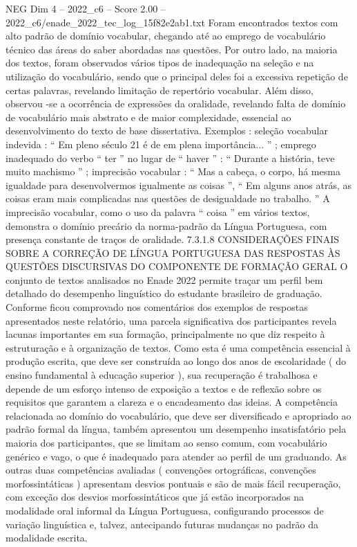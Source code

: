 \begin{textsample}{NEG Dim 4 – 2022\_c6 – Score 2.00 – 2022\_c6/enade\_2022\_tec\_log\_15f82e2ab1.txt}
Foram encontrados textos com alto padrão de domínio vocabular, chegando até ao emprego de vocabulário técnico das áreas do saber abordadas nas questões.
Por outro lado, na maioria dos textos, foram observados vários tipos de inadequação na seleção e na utilização do vocabulário, sendo que o principal deles foi a excessiva repetição de certas palavras, revelando limitação de repertório vocabular.
Além disso, observou -se a ocorrência de expressões da oralidade, revelando falta de domínio de vocabulário mais abstrato e de maior complexidade, essencial ao desenvolvimento do texto de base dissertativa.
Exemplos : seleção vocabular indevida : “ Em pleno século 21 é de em plena importância... ” ; emprego inadequado do verbo “ ter ” no lugar de “ haver ” : “ Durante a história, teve muito machismo ” ; imprecisão vocabular : “ Mas a cabeça, o corpo, há mesma igualdade para desenvolvermos igualmente as coisas ”, “ Em alguns anos atrás, as coisas eram mais complicadas nas questões de desigualdade no trabalho. ” A imprecisão vocabular, como o uso da palavra “ coisa ” em vários textos, demonstra o domínio precário da norma-padrão da Língua Portuguesa, com presença constante de traços de oralidade. 7.3.1.8 CONSIDERAÇÕES FINAIS SOBRE A CORREÇÃO DE LÍNGUA PORTUGUESA DAS RESPOSTAS ÀS QUESTÕES DISCURSIVAS DO COMPONENTE DE FORMAÇÃO GERAL O conjunto de textos analisados no Enade 2022 permite traçar um perfil bem detalhado do desempenho linguístico do estudante brasileiro de graduação.
Conforme ficou comprovado nos comentários dos exemplos de respostas apresentados neste relatório, uma parcela significativa dos participantes revela lacunas importantes em sua formação, principalmente no que diz respeito à estruturação e à organização de textos.
Como esta é uma competência essencial à produção escrita, que deve ser construída ao longo dos anos de escolaridade ( do ensino fundamental à educação superior ), sua recuperação é trabalhosa e depende de um esforço intenso de exposição a textos e de reflexão sobre os requisitos que garantem a clareza e o encadeamento das ideias.
A competência relacionada ao domínio do vocabulário, que deve ser diversificado e apropriado ao padrão formal da língua, também apresentou um desempenho insatisfatório pela maioria dos participantes, que se limitam ao senso comum, com vocabulário genérico e vago, o que é inadequado para atender ao perfil de um graduando.
As outras duas competências avaliadas ( convenções ortográficas, convenções morfossintáticas ) apresentam desvios pontuais e são de mais fácil recuperação, com exceção dos desvios morfossintáticos que já estão incorporados na modalidade oral informal da Língua Portuguesa, configurando processos de variação linguística e, talvez, antecipando futuras mudanças no padrão da modalidade escrita.

\end{textsample}
